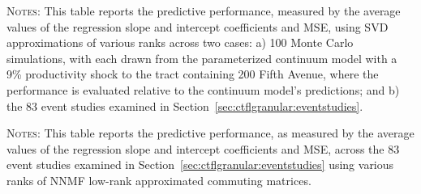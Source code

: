 \documentclass[11pt]{article}
\theoremstyle{definition}
\begin{document}
\begin{table}[h!]
\caption{Summary of SVD Monte Carlo and event study results by rank}
\label{tab:svd:performance}
\vspace{-1.5em}
\begin{center}
\resizebox{\textwidth}{!}{%
}
\begin{minipage}{0.98\textwidth}
{\footnotesize \textsc{Notes}:
This table reports the predictive performance, measured by the average values of the regression slope and intercept coefficients and MSE, using SVD approximations of various ranks across two cases: 
a) 100 Monte Carlo simulations, with each drawn from the parameterized continuum model with a 9\% productivity shock to the tract containing 200 Fifth Avenue, 
where the performance is evaluated relative to the continuum model's predictions; 
and b) the 83 event studies examined in Section~\ref{sec:ctflgranular:eventstudies}.
\par}\end{minipage}
\end{center}
\vspace{-1.5em}
\end{table}


\begin{table}[h!]
\caption{Summary of NNMF event study results by rank}
\label{tab:nnmf:summary}
\vspace{-1.5em}
\begin{center}

\begin{minipage}{0.98\textwidth}
{\footnotesize \textsc{Notes}:
This table reports the predictive performance, as measured by the average values of the regression slope and intercept coefficients and MSE, across the 83 event studies examined in Section~\ref{sec:ctflgranular:eventstudies} using various ranks of NNMF low-rank approximated commuting matrices.
\par}\end{minipage}
\end{center}
\vspace{-1.5em}
\end{table}
\end{document}
